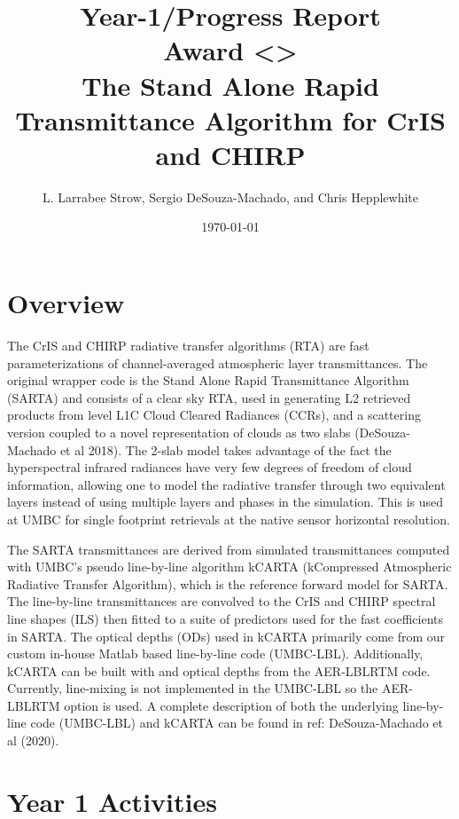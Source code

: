 \documentclass[11pt,twocolumn]{article}
\date{}
\title{}
\begin{document}
\author{L. Larrabee Strow, Sergio DeSouza-Machado, and Chris Hepplewhite}
\date{\today}
\title{\Large Year-1/Progress Report\\ \vspace{0.05in} \normalsize Award <>
  \\The Stand Alone Rapid Transmittance Algorithm for CrIS and CHIRP}
\maketitle

\section{Overview}
\label{sec:orgc323c01}
The CrIS and CHIRP radiative transfer algorithms (RTA) are fast parameterizations
of channel-averaged atmospheric layer transmittances. The original
wrapper code is the Stand Alone Rapid Transmittance Algorithm
(SARTA) and consists of a clear sky RTA, used in generating 
L2 retrieved products from level L1C Cloud Cleared Radiances
(CCRs), and a scattering version coupled to a novel representation
of clouds as two slabs (DeSouza-Machado et al 2018).
The 2-slab model takes advantage of the fact the
hyperspectral infrared radiances have very few degrees of freedom of cloud
information, allowing one to model the radiative transfer through two
equivalent layers instead of using multiple layers and phases in the
simulation. This is used at UMBC for single footprint
retrievals at the native sensor horizontal resolution.

The SARTA transmittances are derived from simulated
transmittances computed with UMBC's pseudo line-by-line algorithm kCARTA
(kCompressed Atmospheric Radiative Transfer Algorithm), which is the
reference forward model for SARTA. The line-by-line transmittances are
convolved to the CrIS and CHIRP spectral line shapes (ILS) then fitted to a suite
of predictors used for the fast coefficients in SARTA.
The optical depths (ODs) used in kCARTA
primarily come from our custom in-house Matlab based line-by-line code
(UMBC-LBL). Additionally, kCARTA can be built with \cd and
\methane optical depths from the AER-LBLRTM code. Currently,
\methane line-mixing is not implemented in the UMBC-LBL so the AER-LBLRTM
option is used.
A complete description of both the underlying
line-by-line code (UMBC-LBL) and kCARTA can be found in
ref: DeSouza-Machado et al (2020).


\section{Year 1 Activities}
\label{sec:org92e7927}
\end{document}
